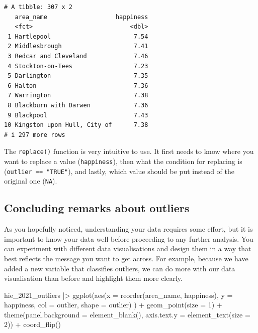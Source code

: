 \documentclass[
  letterpaper,
  DIV=11,
  numbers=noendperiod]{scrreprt}
\newenvironment{Shaded}{\begin{snugshade}}{\end{snugshade}}
\newcommand{\AttributeTok}[1]{\textcolor[rgb]{0.40,0.45,0.13}{#1}}
\newcommand{\DecValTok}[1]{\textcolor[rgb]{0.68,0.00,0.00}{#1}}
\newcommand{\FunctionTok}[1]{\textcolor[rgb]{0.28,0.35,0.67}{#1}}
\newcommand{\NormalTok}[1]{\textcolor[rgb]{0.00,0.23,0.31}{#1}}
\newcommand{\SpecialCharTok}[1]{\textcolor[rgb]{0.37,0.37,0.37}{#1}}
\begin{document}
\begin{verbatim}
# A tibble: 307 x 2
   area_name                   happiness
   <fct>                           <dbl>
 1 Hartlepool                       7.54
 2 Middlesbrough                    7.41
 3 Redcar and Cleveland             7.46
 4 Stockton-on-Tees                 7.23
 5 Darlington                       7.35
 6 Halton                           7.36
 7 Warrington                       7.38
 8 Blackburn with Darwen            7.36
 9 Blackpool                        7.43
10 Kingston upon Hull, City of      7.38
# i 297 more rows
\end{verbatim}

The \texttt{replace()} function is very intuitive to use. It first needs
to know where you want to replace a value (\texttt{happiness}), then
what the condition for replacing is (\texttt{outlier\ ==\ "TRUE"}), and
lastly, which value should be put instead of the original one
(\texttt{NA}).

\subsection{Concluding remarks about
outliers}\label{sec-concluding-remarks-outliers}

As you hopefully noticed, understanding your data requires some effort,
but it is important to know your data well before proceeding to any
further analysis. You can experiment with different data visualisations
and design them in a way that best reflects the message you want to get
across. For example, because we have added a new variable that
classifies outliers, we can do more with our data visualisation than
before and highlight them more clearly.

\begin{Shaded}
\begin{Highlighting}[]
\NormalTok{hie\_2021\_outliers }\SpecialCharTok{|\textgreater{}}
  \FunctionTok{ggplot}\NormalTok{(}\FunctionTok{aes}\NormalTok{(}\AttributeTok{x =} \FunctionTok{reorder}\NormalTok{(area\_name, happiness),}
             \AttributeTok{y =}\NormalTok{ happiness,}
             \AttributeTok{col =}\NormalTok{ outlier,}
             \AttributeTok{shape =}\NormalTok{ outlier)}
\NormalTok{         ) }\SpecialCharTok{+}
  \FunctionTok{geom\_point}\NormalTok{(}\AttributeTok{size =} \DecValTok{1}\NormalTok{) }\SpecialCharTok{+}
  \FunctionTok{theme}\NormalTok{(}\AttributeTok{panel.background =} \FunctionTok{element\_blank}\NormalTok{(),}
        \AttributeTok{axis.text.y =} \FunctionTok{element\_text}\NormalTok{(}\AttributeTok{size =} \DecValTok{2}\NormalTok{)) }\SpecialCharTok{+}
  \FunctionTok{coord\_flip}\NormalTok{()}
\end{Highlighting}
\end{Shaded}
\end{document}
